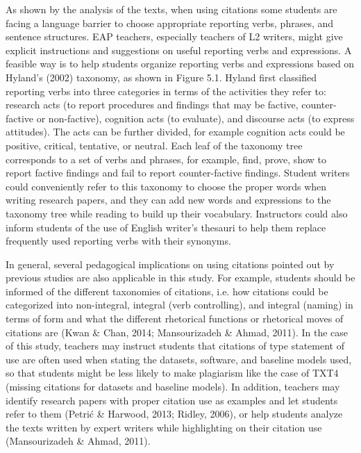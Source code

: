 As shown by the analysis of the texts, when using citations some students are facing a language barrier to choose appropriate reporting verbs, phrases, and sentence structures. EAP teachers, especially teachers of L2 writers, might give explicit instructions and suggestions on useful reporting verbs and expressions. A feasible way is to help students organize reporting verbs and expressions based on Hyland’s (2002) taxonomy, as shown in Figure 5.1. Hyland first classified reporting verbs into three categories in terms of the activities they refer to: research acts (to report procedures and findings that may be factive, counter-factive or non-factive), cognition acts (to evaluate), and discourse acts (to express attitudes). The acts can be further divided, for example cognition acts could be positive, critical, tentative, or neutral. Each leaf of the taxonomy tree corresponds to a set of verbs and phrases, for example, find, prove, show to report factive findings and fail to report counter-factive findings. Student writers could conveniently refer to this taxonomy to choose the proper words when writing research papers, and they can add new words and expressions to the taxonomy tree while reading to build up their vocabulary. Instructors could also inform students of the use of English writer’s thesauri to help them replace frequently used reporting verbs with their synonyms.


In general, several pedagogical implications on using citations pointed out by previous studies are also applicable in this study. For example, students should be informed of the different taxonomies of citations, i.e. how citations could be categorized into non-integral, integral (verb controlling), and integral (naming) in terms of form and what the different rhetorical functions or rhetorical moves of citations are (Kwan \& Chan, 2014; Mansourizadeh \& Ahmad, 2011). In the case of this study, teachers may instruct students that citations of type statement of use are often used when stating the datasets, software, and baseline models used, so that students might be less likely to make plagiarism like the case of TXT4 (missing citations for datasets and baseline models). In addition, teachers may identify research papers with proper citation use as examples and let students refer to them (Petrić \& Harwood, 2013; Ridley, 2006), or help students analyze the texts written by expert writers while highlighting on their citation use (Mansourizadeh \& Ahmad, 2011).